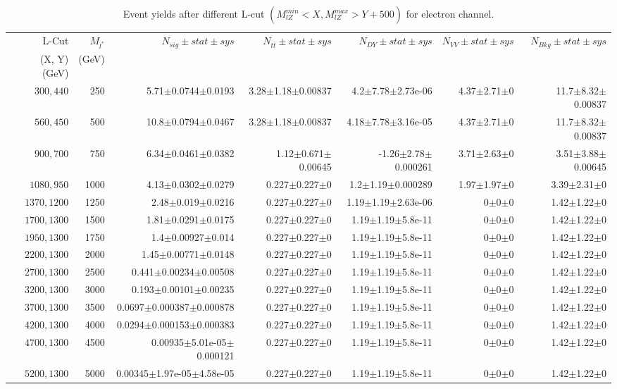 \documentclass[]{article}
\begin{document}
\begin{table}
\begin{center}
\scriptsize{
\begin{tabular}{ |r|r|r|r|r|r|r|}
\hline 
L-Cut & $M_{l^*}$ & $N_{sig}\pm stat \pm sys $ &$N_{t\bar{t}}\pm stat \pm sys $ & $N_{DY}\pm stat \pm sys $ & $N_{VV}\pm stat \pm sys $ &$N_{Bkg}\pm stat \pm sys$\\
 (X, Y) (GeV) & (GeV) & && &&\\
\hline 
$300, 440$ & 250 & 5.71$\pm$0.0744$\pm$0.0193 & 3.28$\pm$1.18$\pm$0.00837 & 4.2$\pm$7.78$\pm$2.73e-06 & 4.37$\pm$2.71$\pm$0 & 11.7$\pm$8.32$\pm$0.00837 \\
$560, 450$ & 500 & 10.8$\pm$0.0794$\pm$0.0467 & 3.28$\pm$1.18$\pm$0.00837 & 4.18$\pm$7.78$\pm$3.16e-05 & 4.37$\pm$2.71$\pm$0 & 11.7$\pm$8.32$\pm$0.00837 \\
$900, 700$ & 750 & 6.34$\pm$0.0461$\pm$0.0382 & 1.12$\pm$0.671$\pm$0.00645 & -1.26$\pm$2.78$\pm$0.000261 & 3.71$\pm$2.63$\pm$0 & 3.51$\pm$3.88$\pm$0.00645 \\
$1080,950$ & 1000 & 4.13$\pm$0.0302$\pm$0.0279 & 0.227$\pm$0.227$\pm$0 & 1.2$\pm$1.19$\pm$0.000289 & 1.97$\pm$1.97$\pm$0 & 3.39$\pm$2.31$\pm$0 \\
$1370,1200$ & 1250 & 2.48$\pm$0.019$\pm$0.0216 & 0.227$\pm$0.227$\pm$0 & 1.19$\pm$1.19$\pm$2.63e-06 & 0$\pm$0$\pm$0 & 1.42$\pm$1.22$\pm$0 \\
$1700,1300$ & 1500 & 1.81$\pm$0.0291$\pm$0.0175 & 0.227$\pm$0.227$\pm$0 & 1.19$\pm$1.19$\pm$5.8e-11 & 0$\pm$0$\pm$0 & 1.42$\pm$1.22$\pm$0 \\
$1950,1300$ & 1750 & 1.4$\pm$0.00927$\pm$0.014 & 0.227$\pm$0.227$\pm$0 & 1.19$\pm$1.19$\pm$5.8e-11 & 0$\pm$0$\pm$0 & 1.42$\pm$1.22$\pm$0 \\
$2200,1300$ & 2000 & 1.45$\pm$0.00771$\pm$0.0148 & 0.227$\pm$0.227$\pm$0 & 1.19$\pm$1.19$\pm$5.8e-11 & 0$\pm$0$\pm$0 & 1.42$\pm$1.22$\pm$0 \\
$2700,1300$ & 2500 & 0.441$\pm$0.00234$\pm$0.00508 & 0.227$\pm$0.227$\pm$0 & 1.19$\pm$1.19$\pm$5.8e-11 & 0$\pm$0$\pm$0 & 1.42$\pm$1.22$\pm$0 \\
$3200,1300$ & 3000 & 0.193$\pm$0.00101$\pm$0.00235 & 0.227$\pm$0.227$\pm$0 & 1.19$\pm$1.19$\pm$5.8e-11 & 0$\pm$0$\pm$0 & 1.42$\pm$1.22$\pm$0 \\
$3700,1300$ & 3500 & 0.0697$\pm$0.000387$\pm$0.000878 & 0.227$\pm$0.227$\pm$0 & 1.19$\pm$1.19$\pm$5.8e-11 & 0$\pm$0$\pm$0 & 1.42$\pm$1.22$\pm$0 \\
$4200,1300$ & 4000 & 0.0294$\pm$0.000153$\pm$0.000383 & 0.227$\pm$0.227$\pm$0 & 1.19$\pm$1.19$\pm$5.8e-11 & 0$\pm$0$\pm$0 & 1.42$\pm$1.22$\pm$0 \\
$4700,1300$ & 4500 & 0.00935$\pm$5.01e-05$\pm$0.000121 & 0.227$\pm$0.227$\pm$0 & 1.19$\pm$1.19$\pm$5.8e-11 & 0$\pm$0$\pm$0 & 1.42$\pm$1.22$\pm$0 \\
$5200,1300$ & 5000 & 0.00345$\pm$1.97e-05$\pm$4.58e-05 & 0.227$\pm$0.227$\pm$0 & 1.19$\pm$1.19$\pm$5.8e-11 & 0$\pm$0$\pm$0 & 1.42$\pm$1.22$\pm$0 \\
\hline 
\end{tabular}
}
\end{center}
\caption{Event yields after different L-cut $(M_{lZ}^{min} < X, M_{lZ}^{max} > Y + 500)$ for electron channel.}
\end{table}
\end{document}
